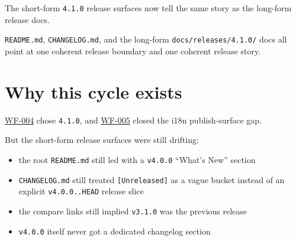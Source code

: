 The short-form \texttt{4\allowbreak{}.\allowbreak{}1\allowbreak{}.\allowbreak{}0} release surfaces now tell the same story as the long-form release docs.

\texttt{R\allowbreak{}E\allowbreak{}A\allowbreak{}D\allowbreak{}M\allowbreak{}E\allowbreak{}.\allowbreak{}m\allowbreak{}d}, \texttt{C\allowbreak{}H\allowbreak{}A\allowbreak{}N\allowbreak{}G\allowbreak{}E\allowbreak{}L\allowbreak{}O\allowbreak{}G\allowbreak{}.\allowbreak{}m\allowbreak{}d}, and the long-form \texttt{d\allowbreak{}o\allowbreak{}c\allowbreak{}s\allowbreak{}/\allowbreak{}r\allowbreak{}e\allowbreak{}l\allowbreak{}e\allowbreak{}a\allowbreak{}s\allowbreak{}e\allowbreak{}s\allowbreak{}/\allowbreak{}4\allowbreak{}.\allowbreak{}1\allowbreak{}.\allowbreak{}0\allowbreak{}/} docs all point at one coherent release boundary and one coherent release story.

\section{Why this cycle exists}\label{record-204-why-this-cycle-exists}

\href{https://github.com/flyingrobots/bijou/blob/cbd70612140e7a450d764b3c7be1c6af878b99bc/docs/design/WF-004-shape-the-next-release.md}{WF-004} chose \texttt{4\allowbreak{}.\allowbreak{}1\allowbreak{}.\allowbreak{}0}, and \href{https://github.com/flyingrobots/bijou/blob/cbd70612140e7a450d764b3c7be1c6af878b99bc/docs/design/WF-005-close-4-1-0-i18n-publish-surface-gap.md}{WF-005} closed the i18n publish-surface gap.

But the short-form release surfaces were still drifting:

\begin{itemize}
\tightlist
\item
  the root \texttt{R\allowbreak{}E\allowbreak{}A\allowbreak{}D\allowbreak{}M\allowbreak{}E\allowbreak{}.\allowbreak{}m\allowbreak{}d} still led with a \texttt{v\allowbreak{}4\allowbreak{}.\allowbreak{}0\allowbreak{}.\allowbreak{}0} ``What's New'' section
\item
  \texttt{C\allowbreak{}H\allowbreak{}A\allowbreak{}N\allowbreak{}G\allowbreak{}E\allowbreak{}L\allowbreak{}O\allowbreak{}G\allowbreak{}.\allowbreak{}m\allowbreak{}d} still treated \texttt{[\allowbreak{}U\allowbreak{}n\allowbreak{}r\allowbreak{}e\allowbreak{}l\allowbreak{}e\allowbreak{}a\allowbreak{}s\allowbreak{}e\allowbreak{}d\allowbreak{}]} as a vague bucket instead of an explicit \texttt{v\allowbreak{}4\allowbreak{}.\allowbreak{}0\allowbreak{}.\allowbreak{}0\allowbreak{}.\allowbreak{}.\allowbreak{}H\allowbreak{}E\allowbreak{}A\allowbreak{}D} release slice
\item
  the compare links still implied \texttt{v\allowbreak{}3\allowbreak{}.\allowbreak{}1\allowbreak{}.\allowbreak{}0} was the previous release
\item
  \texttt{v\allowbreak{}4\allowbreak{}.\allowbreak{}0\allowbreak{}.\allowbreak{}0} itself never got a dedicated changelog section
\end{itemize}


